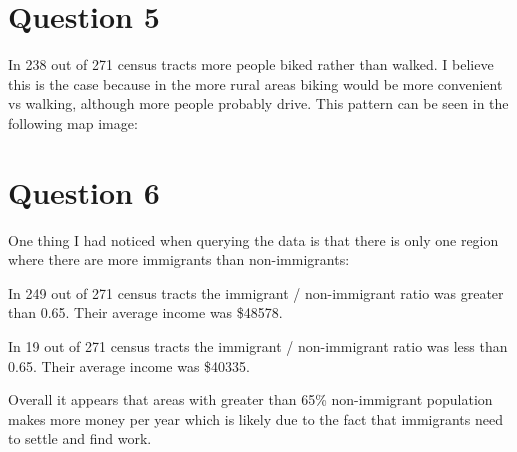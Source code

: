 \documentclass[fleqn, 12pt]{article}
\begin{document}

\section*{Question 5}

In 238 out of 271 census tracts more people biked rather than walked. I believe this is the case because in the more rural areas biking would be more convenient vs walking, although more people probably drive. This pattern can be seen in the following map image:


\newpage

\section*{Question 6}

One thing I had noticed when querying the data is that there is only one region where there are more immigrants than non-immigrants:


In 249 out of 271 census tracts the immigrant / non-immigrant ratio was greater than 0.65. Their average income was \$48578.


In 19 out of 271 census tracts the immigrant / non-immigrant ratio was less than 0.65. Their average income was \$40335.


Overall it appears that areas with greater than 65\% non-immigrant population makes more money per year which is likely due to the fact that immigrants need to settle and find work.
\end{document}
